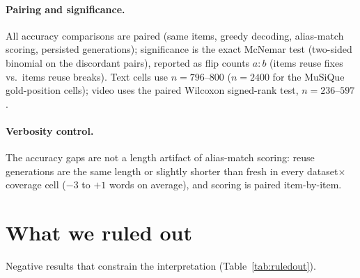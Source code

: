 \documentclass[11pt]{article}
\begin{document}
\paragraph{Pairing and significance.}
All accuracy comparisons are paired (same items, greedy decoding, alias-match scoring, persisted generations); significance is the exact McNemar test (two-sided binomial on the discordant pairs), reported as flip counts $a{:}b$ (items reuse fixes vs.\ items reuse breaks). Text cells use $n=796$--$800$ ($n=2400$ for the MuSiQue gold-position cells); video uses the paired Wilcoxon signed-rank test, $n=236$--$597$.

\paragraph{Verbosity control.}
The accuracy gaps are not a length artifact of alias-match scoring: reuse generations are the same length or slightly shorter than fresh in every dataset$\times$coverage cell ($-3$ to $+1$ words on average), and scoring is paired item-by-item.

\section{What we ruled out}
\label{app:ruledout}

Negative results that constrain the interpretation (Table~\ref{tab:ruledout}).
\end{document}
